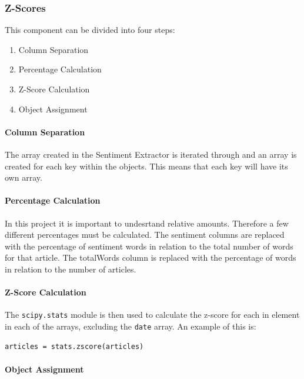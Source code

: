 \subsubsection{Z-Scores}

This component can be divided into four steps:
\begin{enumerate}
    \item Column Separation
    \item Percentage Calculation
    \item Z-Score Calculation
    \item Object Assignment
\end{enumerate}

\paragraph{Column Separation}

The array created in the Sentiment Extractor is iterated through and an array is created for each key within the objects. This means that each key will have its own array.

\paragraph{Percentage Calculation}

In this project it is important to undesrtand relative amounts. Therefore a few different percentages must be calculated. The sentiment columns are replaced with the percentage of sentiment words in relation to the total number of words for that article. The totalWords column is replaced with the percentage of words in relation to the number of articles.

\paragraph{Z-Score Calculation}

The \verb|scipy.stats| module is then used to calculate the z-score for each in element in each of the arrays, excluding the \verb|date| array. An example of this is:
\begin{lstlisting}[caption=Z-Score Calculation]
articles = stats.zscore(articles)
\end{lstlisting}

\paragraph{Object Assignment}

